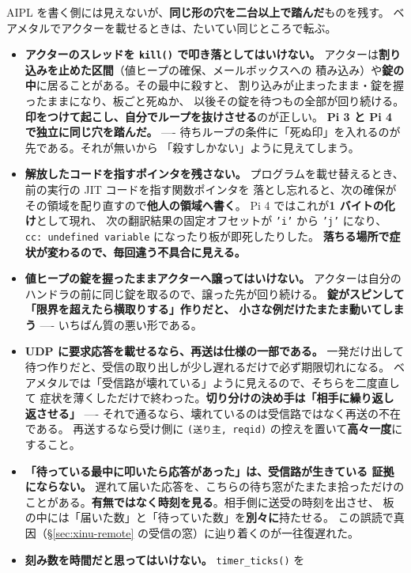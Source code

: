 \documentclass[11pt,a4paper]{ltjsarticle}
\begin{document}
AIPL を書く側には見えないが、\textbf{同じ形の穴を二台以上で踏んだ}ものを残す。
ベアメタルでアクターを載せるときは、たいてい同じところで転ぶ。

\begin{itemize}
\item \textbf{アクターのスレッドを \texttt{kill()} で叩き落としてはいけない。}
  アクターは\textbf{割り込みを止めた区間}（値ヒープの確保、メールボックスへの
  積み込み）や\textbf{錠の中}に居ることがある。その最中に殺すと、
  割り込みが止まったまま・錠を握ったままになり、板ごと死ぬか、
  以後その錠を待つもの全部が回り続ける。
  \textbf{印をつけて起こし、自分でループを抜けさせる}のが正しい。
  \textbf{Pi 3 と Pi 4 で独立に同じ穴を踏んだ。}
  ---- 待ちループの条件に「死ぬ印」を入れるのが先である。それが無いから
  「殺すしかない」ように見えてしまう。
\item \textbf{解放したコードを指すポインタを残さない。}
  プログラムを載せ替えるとき、前の実行の JIT コードを指す関数ポインタを
  落とし忘れると、次の確保がその領域を配り直すので\textbf{他人の領域へ書く}。
  Pi 4 ではこれが\textbf{1 バイトの化け}として現れ、
  次の翻訳結果の固定オフセットが \texttt{'i'} から \texttt{'j'} になり、
  \texttt{cc: undefined variable} になったり板が即死したりした。
  \textbf{落ちる場所で症状が変わるので、毎回違う不具合に見える。}
\item \textbf{値ヒープの錠を握ったままアクターへ譲ってはいけない。}
  アクターは自分のハンドラの前に同じ錠を取るので、譲った先が回り続ける。
  \textbf{錠がスピンして「限界を超えたら横取りする」作りだと、
  小さな例だけたまたま動いてしまう} ---- いちばん質の悪い形である。
\item \textbf{UDP に要求応答を載せるなら、再送は仕様の一部である。}
  一発だけ出して待つ作りだと、受信の取り出しが少し遅れるだけで必ず期限切れになる。
  ベアメタルでは「受信路が壊れている」ように見えるので、そちらを二度直して
  症状を薄くしただけで終わった。\textbf{切り分けの決め手は「相手に繰り返し返させる」}
  ---- それで通るなら、壊れているのは受信路ではなく再送の不在である。
  再送するなら受け側に \texttt{(送り主, reqid)} の控えを置いて\textbf{高々一度}にすること。
\item \textbf{「待っている最中に叩いたら応答があった」は、受信路が生きている
  証拠にならない。} 遅れて届いた応答を、こちらの待ち窓がたまたま拾っただけの
  ことがある。\textbf{有無ではなく時刻を見る}。相手側に送受の時刻を出させ、
  板の中には「届いた数」と「待っていた数」を\textbf{別々に}持たせる。
  この誤読で真因（\S\ref{sec:xinu-remote} の受信の窓）に辿り着くのが一往復遅れた。
\item \textbf{刻み数を時間だと思ってはいけない。} \texttt{timer\_ticks()} を

\end{itemize}
\end{document}
